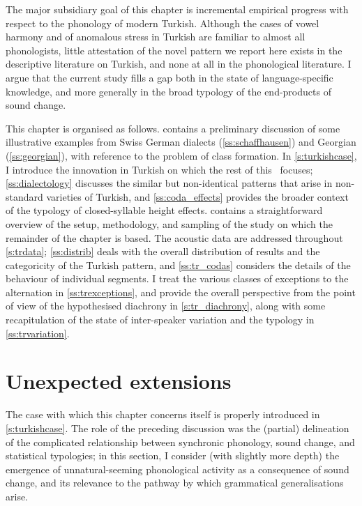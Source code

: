 The major subsidiary goal of this chapter is incremental empirical progress with respect to the phonology of modern Turkish. Although the cases of vowel harmony and of anomalous stress in Turkish are familiar to almost all phonologists, little attestation of the novel pattern we report here exists in the descriptive literature on Turkish, and none at all in the phonological literature. I argue that the current study fills a gap both in the state of language-specific knowledge, and more generally in the broad typology of the end-products of sound change.

This chapter is organised as follows.  contains a preliminary discussion of some illustrative examples from Swiss German dialects (\cref{ss:schaffhausen}) and Georgian (\cref{ss:georgian}), with reference to the problem of class formation. In \cref{s:turkishcase}, I introduce the innovation in Turkish on which the rest of this \instance \ focuses; \cref{ss:dialectology} discusses the similar but non-identical patterns that arise in non-standard varieties of Turkish, and \cref{ss:coda_effects} provides the broader context of the typology of closed-syllable height effects.  contains a straightforward overview of the setup, methodology, and sampling of the study on which the remainder of the chapter is based. The acoustic data are addressed throughout \cref{s:trdata}; \cref{ss:distrib} deals with the overall distribution of results and the categoricity of the Turkish pattern, and \cref{ss:tr_codas} considers the details of the behaviour of individual segments. I treat the various classes of exceptions to the alternation in \cref{ss:trexceptions}, and provide the overall perspective from the point of view of the hypothesised diachrony in \cref{s:tr_diachrony}, along with some recapitulation of the state of inter-speaker variation and the typology in \cref{ss:trvariation}.

\section{Unexpected extensions}\label{s:naturalclasses}

The case with which this chapter concerns itself is properly introduced in \cref{s:turkishcase}. The role of the preceding discussion was the (partial) delineation of the complicated relationship between synchronic phonology, sound change, and statistical typologies; in this section, I consider (with slightly more depth) the emergence of unnatural-seeming phonological activity as a consequence of sound change, and its relevance to the pathway by which grammatical generalisations arise.

